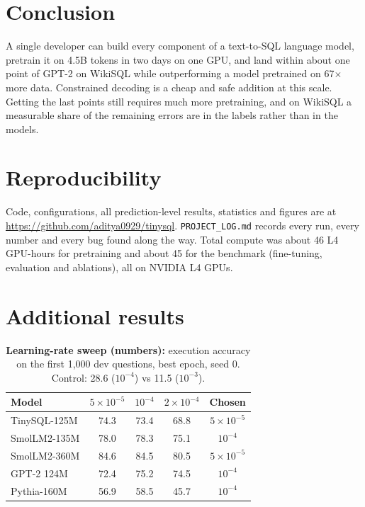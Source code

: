 \documentclass[11pt]{article}
\begin{document}
\section{Conclusion}

A single developer can build every component of a text-to-SQL language model, pretrain it on 4.5B tokens in two days on one GPU, and land within about one point of GPT-2 on WikiSQL while outperforming a model pretrained on 67$\times$ more data. Constrained decoding is a cheap and safe addition at this scale. Getting the last points still requires much more pretraining, and on WikiSQL a measurable share of the remaining errors are in the labels rather than in the models.

\section*{Reproducibility}

Code, configurations, all prediction-level results, statistics and figures are at \url{https://github.com/aditya0929/tinysql}. \texttt{PROJECT\_LOG.md} records every run, every number and every bug found along the way. Total compute was about 46 L4 GPU-hours for pretraining and about 45 for the benchmark (fine-tuning, evaluation and ablations), all on NVIDIA L4 GPUs.




\appendix
\section{Additional results}

\begin{table}[h]
\centering
\small
\begin{tabular}{lcccc}
\toprule
Model & $5\times10^{-5}$ & $10^{-4}$ & $2\times10^{-4}$ & Chosen \\
\midrule
TinySQL-125M & 74.3 & 73.4 & 68.8 & $5\times10^{-5}$ \\
SmolLM2-135M & 78.0 & 78.3 & 75.1 & $10^{-4}$ \\
SmolLM2-360M & 84.6 & 84.5 & 80.5 & $5\times10^{-5}$ \\
GPT-2 124M & 72.4 & 75.2 & 74.5 & $10^{-4}$ \\
Pythia-160M & 56.9 & 58.5 & 45.7 & $10^{-4}$ \\
\bottomrule
\end{tabular}
\caption{\textbf{Learning-rate sweep (numbers):} execution accuracy on the first 1,000 dev questions, best epoch, seed 0. Control: 28.6 ($10^{-4}$) vs 11.5 ($10^{-3}$).}
\label{tab:lr}
\end{table}
\end{document}
